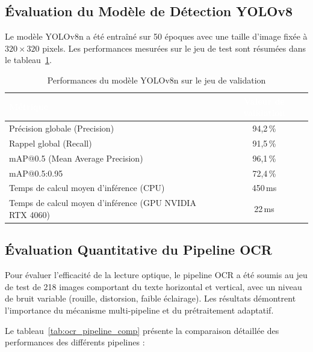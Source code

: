 \documentclass[12pt,a4paper]{article}
\begin{document}
\subsection{Évaluation du Modèle de Détection YOLOv8}

Le modèle YOLOv8n a été entraîné sur 50 époques avec une taille d'image fixée à $320 \times 320$ pixels. Les performances mesurées sur le jeu de test sont résumées dans le tableau~\ref{tab:yolo_val_results}.

\begin{table}[H]
\centering
\caption{Performances du modèle YOLOv8n sur le jeu de validation}
\begin{tabular}{|l|c|}
\hline
\rowcolor{TableHeader}\textcolor{white}{\textbf{Métrique}} & \textcolor{white}{\textbf{Valeur de validation}} \\ \hline
Précision globale (Precision) & 94,2\,\% \\ \hline
Rappel global (Recall) & 91,5\,\% \\ \hline
mAP@0.5 (Mean Average Precision) & 96,1\,\% \\ \hline
mAP@0.5:0.95 & 72,4\,\% \\ \hline
Temps de calcul moyen d'inférence (CPU) & 450\,ms \\ \hline
Temps de calcul moyen d'inférence (GPU NVIDIA RTX 4060) & 22\,ms \\ \hline
\end{tabular}
\label{tab:yolo_val_results}
\end{table}

\subsection{Évaluation Quantitative du Pipeline OCR}

Pour évaluer l'efficacité de la lecture optique, le pipeline OCR a été soumis au jeu de test de 218 images comportant du texte horizontal et vertical, avec un niveau de bruit variable (rouille, distorsion, faible éclairage). Les résultats démontrent l'importance du mécanisme multi-pipeline et du prétraitement adaptatif.

Le tableau~\ref{tab:ocr_pipeline_comp} présente la comparaison détaillée des performances des différents pipelines :
\end{document}
